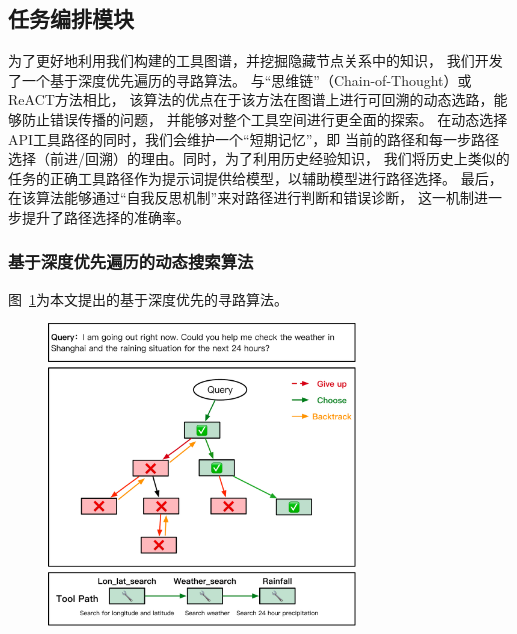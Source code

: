 





\subsection{任务编排模块}

为了更好地利用我们构建的工具图谱，并挖掘隐藏节点关系中的知识，
我们开发了一个基于深度优先遍历的寻路算法。
与“思维链”（Chain-of-Thought）或ReACT方法相比，
该算法的优点在于该方法在图谱上进行可回溯的动态选路，能够防止错误传播的问题，
并能够对整个工具空间进行更全面的探索。
在动态选择API工具路径的同时，我们会维护一个“短期记忆”，即
当前的路径和每一步路径选择（前进/回溯）的理由。同时，为了利用历史经验知识，
我们将历史上类似的任务的正确工具路径作为提示词提供给模型，以辅助模型进行路径选择。
最后，在该算法能够通过“自我反思机制”来对路径进行判断和错误诊断，
这一机制进一步提升了路径选择的准确率。

\subsubsection{基于深度优先遍历的动态搜索算法}

图~\ref{fig:ch4-dfs}为本文提出的基于深度优先的寻路算法。

\begin{figure}[!htp]
  \vspace{1em}
  \centering
  \setlength{\abovecaptionskip}{10pt} %
  \includegraphics[height=8cm]{../assets/ch4-dfs算法.pdf}
  \label{fig:ch4-dfs}
\end{figure}

